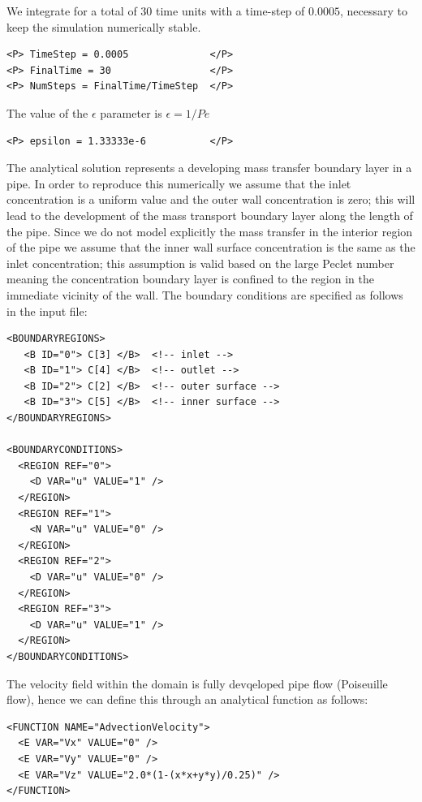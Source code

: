We integrate for a total of $30$ time units with a time-step of $0.0005$,
necessary to keep the simulation numerically stable.
\begin{lstlisting}[style=XMLStyle]
<P> TimeStep = 0.0005              </P>
<P> FinalTime = 30                 </P>
<P> NumSteps = FinalTime/TimeStep  </P>
\end{lstlisting}

The value of the $\epsilon$ parameter is $\epsilon = 1/Pe$
\begin{lstlisting}[style=XMLStyle]
<P> epsilon = 1.33333e-6           </P>
\end{lstlisting}

The analytical solution represents a developing mass transfer boundary layer in
a pipe. In order to reproduce this numerically we assume that the inlet
concentration is a uniform value and the outer wall concentration is zero; this
will lead to the development of the mass transport boundary layer along the
length of the pipe. Since we do not model explicitly the mass transfer in the
interior region of the pipe we assume that the inner wall surface concentration
is the same as the inlet concentration; this assumption is valid based on the
large Peclet number meaning the concentration boundary layer is confined to the
region in the immediate vicinity of the wall. The boundary conditions are
specified as follows in the input file:
\begin{lstlisting}[style=XMLStyle]
<BOUNDARYREGIONS>
   <B ID="0"> C[3] </B>  <!-- inlet -->
   <B ID="1"> C[4] </B>  <!-- outlet -->
   <B ID="2"> C[2] </B>  <!-- outer surface -->
   <B ID="3"> C[5] </B>  <!-- inner surface -->
</BOUNDARYREGIONS>

<BOUNDARYCONDITIONS>
  <REGION REF="0">
    <D VAR="u" VALUE="1" />
  </REGION>
  <REGION REF="1">
    <N VAR="u" VALUE="0" />
  </REGION>
  <REGION REF="2">
    <D VAR="u" VALUE="0" />
  </REGION>
  <REGION REF="3">
    <D VAR="u" VALUE="1" />
  </REGION>
</BOUNDARYCONDITIONS>
\end{lstlisting}

The velocity field within the domain is fully devqeloped pipe flow (Poiseuille
flow), hence we can define this through an analytical function as follows:
\begin{lstlisting}[style=XMLStyle]
<FUNCTION NAME="AdvectionVelocity">
  <E VAR="Vx" VALUE="0" />
  <E VAR="Vy" VALUE="0" />
  <E VAR="Vz" VALUE="2.0*(1-(x*x+y*y)/0.25)" />
</FUNCTION>
\end{lstlisting}

